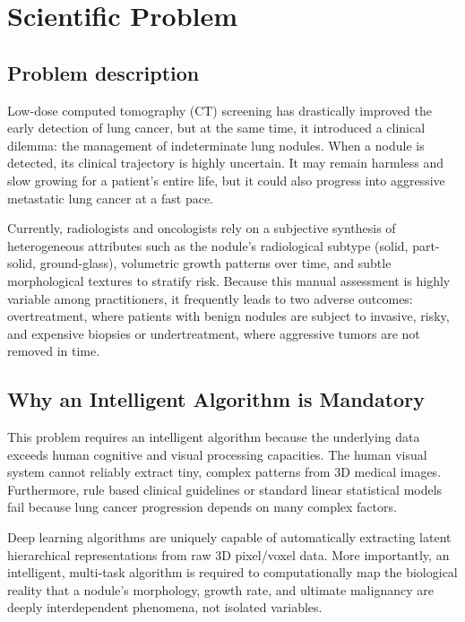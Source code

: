 \chapter{Scientific Problem}
\label{section:scientificProblem}
\section{Problem description}
\label{section:problemDescription}
Low-dose computed tomography (CT) screening has drastically improved the early detection of lung cancer, but at the same time, it introduced a clinical dilemma: the management of indeterminate lung nodules. When a nodule is detected, its clinical trajectory is highly uncertain. It may remain harmless and slow growing for a patient's entire life, but it could also progress into aggressive metastatic lung cancer at a fast pace.

Currently, radiologists and oncologists rely on a subjective synthesis of heterogeneous attributes such as the nodule's radiological subtype (solid, part-solid, ground-glass), volumetric growth patterns over time, and subtle morphological textures to stratify risk. Because this manual assessment is highly variable among practitioners, it frequently leads to two adverse outcomes: overtreatment, where patients with benign nodules are subject to invasive, risky, and expensive biopsies or undertreatment, where aggressive tumors are not removed in time.

\section{Why an Intelligent Algorithm is Mandatory}
\label{section:whyAnIntelligentAlgorithmIsMandatory}
This problem requires an intelligent algorithm because the underlying data exceeds human cognitive and visual processing capacities. The human visual system cannot reliably extract tiny, complex patterns from 3D medical images. Furthermore, rule based clinical guidelines or standard linear statistical models fail because lung cancer progression depends on many complex factors.

Deep learning algorithms are uniquely capable of automatically extracting latent hierarchical representations from raw 3D pixel/voxel data. More importantly, an intelligent, multi-task algorithm is required to computationally map the biological reality that a nodule's morphology, growth rate, and ultimate malignancy are deeply interdependent phenomena, not isolated variables.

